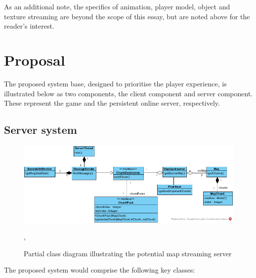 \documentclass{scrartcl}
\begin{document}
As an additional note, the specifics of animation, player model, object and texture streaming are beyond the scope of this essay, but are noted above for the reader's interest.

\section{Proposal}
The proposed system base, designed to prioritise the player experience, is illustrated below as two components, the client component and server component. These represent the game and the persistent online server, respectively.

\subsection{Server system}
\begin{figure}[H]
	\centering
	\includegraphics[width=0.7\linewidth]{Server_Side_Streamer.png}
	\caption{Partial class diagram illustrating the potential map streaming server},
	\label{fig:serversystem}
\end{figure}

The proposed system would comprise the following key classes:
\end{document}

